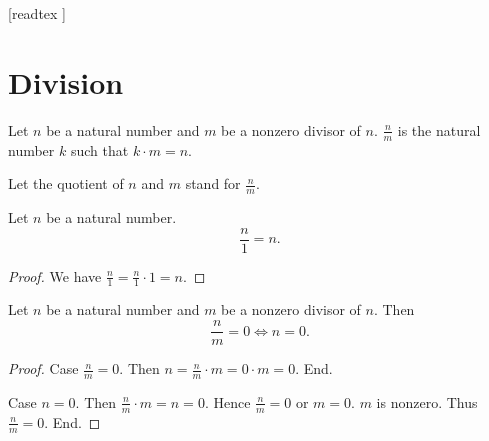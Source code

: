 \documentclass[10pt]{article}
\begin{document}
  \begin{imports}
    \begin{forthel}
      [readtex ]
    \end{forthel}
  \end{imports}


  \section{Division}

  \begin{forthel}
    \begin{definition}
      Let $n$ be a natural number and $m$ be a nonzero divisor of $n$.
      $\frac{n}{m}$ is the natural number $k$ such that $k \cdot m = n$.
    \end{definition}

    Let the quotient of $n$ and $m$ stand for $\frac{n}{m}$.
  \end{forthel}

  \begin{forthel}
    \begin{proposition}
      Let $n$ be a natural number.
      \[ \frac{n}{1} = n. \]
    \end{proposition}
    \begin{proof}
      We have $\frac{n}{1} = \frac{n}{1} \cdot 1 = n$.
    \end{proof}
  \end{forthel}

  \begin{forthel}
    \begin{proposition}
      Let $n$ be a natural number and $m$ be a nonzero divisor of $n$.
      Then \[ \frac{n}{m} = 0 \iff n = 0. \]
    \end{proposition}
    \begin{proof}
      Case $\frac{n}{m} = 0$.
        Then $n = \frac{n}{m} \cdot m = 0 \cdot m = 0$.
      End.

      Case $n = 0$.
        Then $\frac{n}{m} \cdot m = n = 0$.
        Hence $\frac{n}{m} = 0$ or $m = 0$.
        $m$ is nonzero.
        Thus $\frac{n}{m} = 0$.
      End.
    \end{proof}
  \end{forthel}
\end{document}

